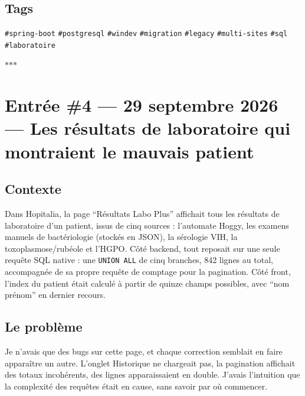 \documentclass[10pt,twoside,openany]{article}
\newcommand{\entryrule}{\par\vspace{1.2em}\begin{center}\color{accentblue}$\ast$\quad$\ast$\quad$\ast$\end{center}\par}
\newcommand{\tag}[1]{\texttt{\footnotesize\color{tagolive}\#{#1}}}
\begin{document}
\subsection*{Tags}
\tag{spring-boot} \quad \tag{postgresql} \quad \tag{windev} \quad \tag{migration} \quad \tag{legacy} \quad \tag{multi-sites} \quad \tag{sql} \quad \tag{laboratoire}

\entryrule

\section{Entrée \#4 --- 29 septembre 2026 --- Les résultats de laboratoire qui montraient le mauvais patient}

\subsection*{Contexte}
Dans Hopitalia, la page \enquote{Résultats Labo Plus} affichait tous les résultats de laboratoire d'un patient, issus de cinq sources : l'automate Hoggy, les examens manuels de bactériologie (stockés en JSON), la sérologie VIH, la toxoplasmose/rubéole et l'HGPO. Côté backend, tout reposait sur une seule requête SQL native : une \texttt{UNION ALL} de cinq branches, 842 lignes au total, accompagnée de sa propre requête de comptage pour la pagination. Côté front, l'index du patient était calculé à partir de quinze champs possibles, avec \enquote{nom prénom} en dernier recours.

\subsection*{Le problème}
Je n'avais que des bugs sur cette page, et chaque correction semblait en faire apparaître un autre. L'onglet Historique ne chargeait pas, la pagination affichait des totaux incohérents, des lignes apparaissaient en double. J'avais l'intuition que la complexité des requêtes était en cause, sans savoir par où commencer.
\end{document}
